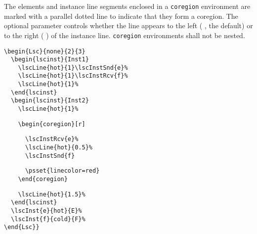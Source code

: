 \documentclass{article}
\newcommand{\env}[1]{\texttt{#1}}
\newcommand{\con}[1]{%
  \ifmmode{\texttt{#1}}\else{`\texttt{#1}'}\fi}
\newcommand{\mcoregion}{\env{coregion}}
\newcommand{\ml}{\con{l}}%
\newcommand{\mr}{\con{r}}%
\begin{document}
The elements and instance line segments enclosed in a \mcoregion{} environment
are marked with a parallel dotted line to indicate that they form a 
coregion.
%
The optional parameter controls whether the line appears to the left (\ml{},
the default) or to the right (\mr) of the instance line.
%
\mcoregion{} environments shall not be nested.

\begin{center}%
\begin{minipage}{0.45\textwidth}%
\end{minipage}%
\hfill%
\begin{minipage}{0.49\textwidth}%
\small%
{\gray\begin{verbatim}
\begin{Lsc}{none}{2}{3}
  \begin{lscinst}{Inst1}
    \lscLine{hot}{1}\lscInstSnd{e}%
    \lscLine{hot}{1}\lscInstRcv{f}%
    \lscLine{hot}{1}%
  \end{lscinst}
  \begin{lscinst}{Inst2}
    \lscLine{hot}{1}%
\end{verbatim}}%
\verbunskip%
{\begin{verbatim}
    \begin{coregion}[r]
\end{verbatim}}%
\verbunskip%
{\gray\begin{verbatim}
      \lscInstRcv{e}%
      \lscLine{hot}{0.5}%
      \lscInstSnd{f}
\end{verbatim}}%
\verbunskip%
{\begin{verbatim}
      \psset{linecolor=red}
    \end{coregion}
\end{verbatim}}%
\verbunskip%
{\gray\begin{verbatim}
    \lscLine{hot}{1.5}%
  \end{lscinst}
  \lscInst{e}{hot}{E}%
  \lscInst{f}{cold}{F}%
\end{Lsc}}
\end{verbatim}}%
\end{minipage}
\end{center}%
\end{document}
